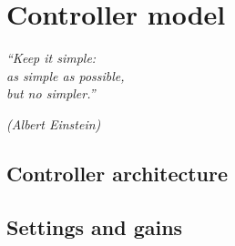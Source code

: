 \chapter{Controller model}
\epigraph{\em ``Keep it simple:\\
as simple as possible,\\
but no simpler.''}{\em (Albert Einstein)}
\section{Controller architecture}
\section{Settings and gains}
